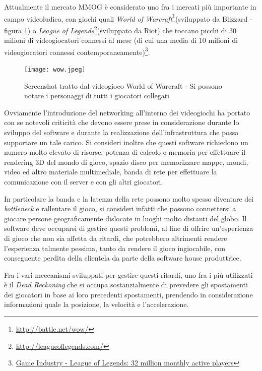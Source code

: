 \documentclass[a4paper,11pt]{article}
\begin{document}
Attualmente il mercato MMOG \`e considerato uno fra i mercati pi\`u importante in campo videoludico, con giochi quali \emph{World of Warcraft}\footnote{\url{http://battle.net/wow/}}(sviluppato da Blizzard - figura \ref{img:wow}) o \emph{League of Legends}\footnote{\url{http://leagueoflegends.com/}}(sviluppato da Riot) che toccano picchi di 30 milioni di videogiocatori connessi al mese (di cui una media di 10 milioni di videogiocatori connessi contemporaneamente)\footnote{\href{http://www.gamesindustry.biz/articles/2012-10-12-league-of-legends-32-million-monthly-active-users}{Game Industry - League of Legends: 32 million monthly active players\small}}.

\begin{figure}[ht]
\centering
\texttt{[image: wow.jpeg]}
\caption{\small{Screenshot tratto dal videogioco World of Warcraft - Si possono notare i personaggi di tutti i giocatori collegati}}
\label{img:wow}
\end{figure}

Ovviamente l'introduzione del networking all'interno dei videogiochi ha portato con se notevoli criticit\`a che devono essere prese in considerazione durante lo sviluppo del software e durante la realizzazione dell'infrastruttura che possa supportare un tale carico. Si consideri inoltre che questi software richiedono un numero molto elevato di risorse: potenza di calcolo e memoria per effettuare il rendering 3D del mondo di gioco, spazio disco per memorizzare mappe, mondi, video ed altro materiale multimediale, banda di rete per effettuare la comunicazione con il server e con gli altri giocatori.

In particolare la banda e la latenza della rete possono molto spesso diventare dei \emph{bottleneck} e rallentare il gioco, si consideri infatti che possono connettersi a giocare persone geograficamente dislocate in luoghi molto distanti del globo. Il software deve occuparsi di gestire questi problemi, al fine di offrire un'esperienza di gioco che non sia affetta da ritardi, che potrebbero altrimenti rendere l'esperienza talmente pessima, tanto da rendere il gioco ingiocabile, con conseguente perdita della clientela da parte della software house produttrice.

Fra i vari meccanismi sviluppati per gestire questi ritardi, uno fra i pi\`u utilizzati \`e il \emph{Dead Reckoning} che si occupa sostanzialmente di prevedere gli spostamenti dei giocatori in base ai loro precedenti spostamenti, prendendo in considerazione informazioni quale la posizione, la velocit\`a e l'accelerazione.
\end{document}
